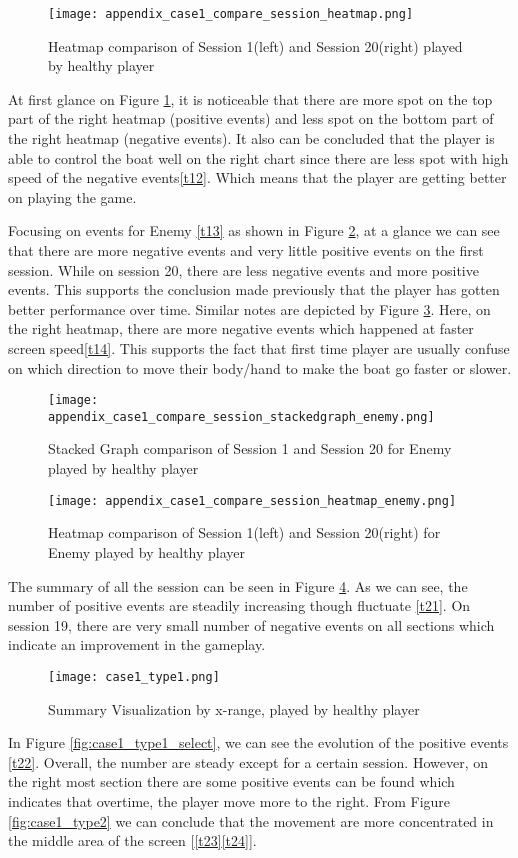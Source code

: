 \begin{figure}[H]
\centering
\texttt{[image: appendix\_case1\_compare\_session\_heatmap.png]}
\caption{Heatmap comparison of Session 1(left) and Session 20(right) played by healthy player}
\label{fig:app1_heatmap}
\end{figure}
At first glance on Figure \ref{fig:app1_heatmap}, it is noticeable that there are more spot on the top part of the right heatmap (positive events) and less spot on the bottom part of the right heatmap (negative events). It also can be concluded that the player is able to control the boat well on the right chart since there are less spot with high speed of the negative events\ref{t12}. Which means that the player are getting better on playing the game. 

Focusing on events for Enemy \ref{t13} as shown in Figure \ref{fig:app1_stacked_enemy}, at a glance we can see that there are more negative events and very little positive events on the first session. While on session 20, there are less negative events and more positive events. This supports the conclusion made previously that the player has gotten better performance over time. Similar notes are depicted by Figure \ref{fig:app1_heatmap_enemy}. Here, on the right heatmap, there are more negative events which happened at faster screen speed\ref{t14}. This supports the fact that first time player are usually confuse on which direction to move their body/hand to make the boat go faster or slower.

\begin{figure}[H]
\centering
\texttt{[image: appendix\_case1\_compare\_session\_stackedgraph\_enemy.png]}
\caption{Stacked Graph comparison of Session 1 and Session 20 for Enemy played by healthy player}
\label{fig:app1_stacked_enemy}
\end{figure}

\begin{figure}[H]
\centering
\texttt{[image: appendix\_case1\_compare\_session\_heatmap\_enemy.png]}
\caption{Heatmap comparison of Session 1(left) and Session 20(right) for Enemy played by healthy player}
\label{fig:app1_heatmap_enemy}
\end{figure}

The summary of all the session can be seen in Figure \ref{fig:case1_type1}. As we can see, the number of positive events are steadily increasing though fluctuate \ref{t21}. On session 19, there are very small number of negative events on all sections which indicate an improvement in the gameplay. 
\begin{figure}[H]
\centering
\texttt{[image: case1\_type1.png]}
\caption{Summary Visualization by x-range, played by healthy player}
\label{fig:case1_type1}
\end{figure}
In Figure \ref{fig:case1_type1_select}, we can see the evolution of the positive events \ref{t22}. Overall, the number are steady except for a certain session. However, on the right most section there are some positive events can be found which indicates that overtime, the player move more to the right. From Figure \ref{fig:case1_type2} we can conclude that the movement are more concentrated in the middle area of the screen [\ref{t23}\ref{t24}].

